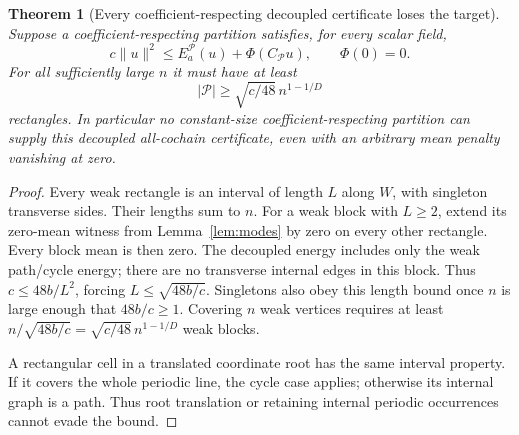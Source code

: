 \documentclass[11pt]{article}
\newtheorem{theorem}{Theorem}
\begin{document}
\begin{theorem}[Every coefficient-respecting decoupled certificate loses the target]\label{thm:obstruction}
Suppose a coefficient-respecting partition satisfies, for every scalar field,
\[
 c\|u\|^2\le E_a^{\mathcal P}(u)+\Phi(C_{\mathcal P}u),\qquad\Phi(0)=0.
\]
For all sufficiently large $n$ it must have at least
\[
 |\mathcal P|\ge\sqrt{c/48}\,n^{1-1/D}
\]
rectangles. In particular no constant-size coefficient-respecting partition can supply this decoupled all-cochain certificate, even with an arbitrary mean penalty vanishing at zero.
\end{theorem}
\begin{proof}
Every weak rectangle is an interval of length $L$ along $W$, with singleton transverse sides. Their lengths sum to $n$. For a weak block with $L\ge2$, extend its zero-mean witness from Lemma~\ref{lem:modes} by zero on every other rectangle. Every block mean is then zero. The decoupled energy includes only the weak path/cycle energy; there are no transverse internal edges in this block. Thus $c\le48b/L^2$, forcing $L\le\sqrt{48b/c}$. Singletons also obey this length bound once $n$ is large enough that $48b/c\ge1$. Covering $n$ weak vertices requires at least $n/\sqrt{48b/c}=\sqrt{c/48}\,n^{1-1/D}$ weak blocks.

A rectangular cell in a translated coordinate root has the same interval property. If it covers the whole periodic line, the cycle case applies; otherwise its internal graph is a path. Thus root translation or retaining internal periodic occurrences cannot evade the bound.
\end{proof}
\end{document}
